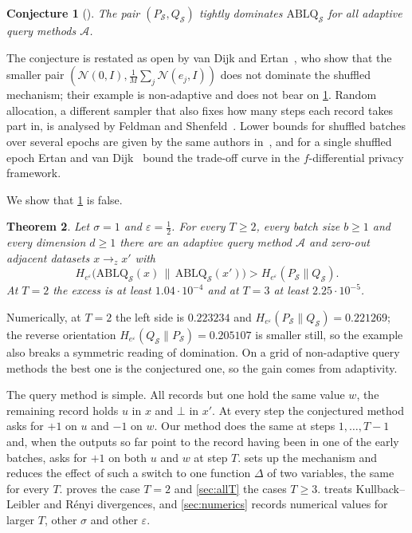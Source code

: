 \documentclass[11pt]{amsart}
\newtheorem{theorem}{Theorem}[section]
\newtheorem{conjecture}[theorem]{Conjecture}
\theoremstyle{definition}
\theoremstyle{remark}
\newcommand{\N}{\mathcal N}
\newcommand{\He}{H_{e^{\varepsilon}}}
\begin{document}
\begin{conjecture}[{\cite[Conjecture~3.2]{CGKKMSZ24}}]\label{conj:CGKKMSZ}
The pair $(P_{\mathcal S},Q_{\mathcal S})$ tightly dominates $\mathrm{ABLQ}_{\mathcal S}$ for all adaptive query methods $\mathcal A$.
\end{conjecture}

The conjecture is restated as open by van Dijk and Ertan~\cite[Appendix~J]{vDE26}, who show that the smaller pair $(\N(0,I),\frac1M\sum_j\N(e_j,I))$ does not dominate the shuffled mechanism; their example is non-adaptive and does not bear on \cref{conj:CGKKMSZ}. Random allocation, a different sampler that also fixes how many steps each record takes part in, is analysed by Feldman and Shenfeld~\cite{FS25}. Lower bounds for shuffled batches over several epochs are given by the same authors in~\cite{CGKKMSZ24b}, and for a single shuffled epoch Ertan and van Dijk~\cite{EvD26} bound the trade-off curve in the $f$-differential privacy framework.

We show that \cref{conj:CGKKMSZ} is false.

\begin{theorem}\label{thm:main}
Let $\sigma=1$ and $\varepsilon=\frac12$. For every $T\ge2$, every batch size $b\ge1$ and every dimension $d\ge1$ there are an adaptive query method $\mathcal A$ and zero-out adjacent datasets $x\to_z x'$ with
\[
\He\bigl(\mathrm{ABLQ}_{\mathcal S}(x)\,\big\|\,\mathrm{ABLQ}_{\mathcal S}(x')\bigr)>\He(P_{\mathcal S}\|Q_{\mathcal S}).
\]
At $T=2$ the excess is at least $1.04\cdot10^{-4}$ and at $T=3$ at least $2.25\cdot10^{-5}$.
\end{theorem}

Numerically, at $T=2$ the left side is $0.223234$ and $\He(P_{\mathcal S}\|Q_{\mathcal S})=0.221269$; the reverse orientation $\He(Q_{\mathcal S}\|P_{\mathcal S})=0.205107$ is smaller still, so the example also breaks a symmetric reading of domination. On a grid of non-adaptive query methods the best one is the conjectured one, so the gain comes from adaptivity.

The query method is simple. All records but one hold the same value $w$, the remaining record holds $u$ in $x$ and $\bot$ in $x'$. At every step the conjectured method asks for $+1$ on $u$ and $-1$ on $w$. Our method does the same at steps $1,\dots,T-1$ and, when the outputs so far point to the record having been in one of the early batches, asks for $+1$ on both $u$ and $w$ at step $T$.  sets up the mechanism and reduces the effect of such a switch to one function $\Delta$ of two variables, the same for every $T$.  proves the case $T=2$ and \cref{sec:allT} the cases $T\ge3$.  treats Kullback--Leibler and R\'enyi divergences, and \cref{sec:numerics} records numerical values for larger $T$, other $\sigma$ and other $\varepsilon$.
\end{document}
